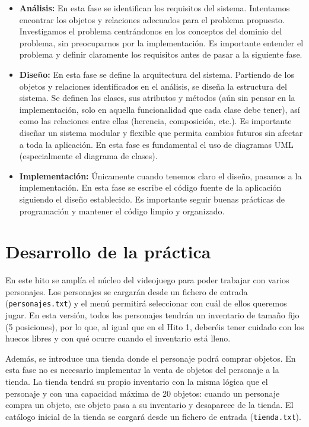 \documentclass[11pt,a4paper]{article}
\begin{document}
\begin{itemize}
    \item \textbf{Análisis:} En esta fase se identifican los requisitos del sistema. Intentamos encontrar los objetos y relaciones adecuados para el problema propuesto. Investigamos el problema centrándonos en los conceptos del dominio del problema, sin preocuparnos por la implementación. Es importante entender el problema y definir claramente los requisitos antes de pasar a la siguiente fase.
    \item \textbf{Diseño:} En esta fase se define la arquitectura del sistema. Partiendo de los objetos y relaciones identificados en el análisis, se diseña la estructura del sistema. Se definen las clases, sus atributos y métodos (aún sin pensar en la implementación, solo en aquella funcionalidad que cada clase debe tener), así como las relaciones entre ellas (herencia, composición, etc.). Es importante diseñar un sistema modular y flexible que permita cambios futuros sin afectar a toda la aplicación. En esta fase es fundamental el uso de diagramas UML (especialmente el diagrama de clases).
    \item \textbf{Implementación:} Únicamente cuando tenemos claro el diseño, pasamos a la implementación. En esta fase se escribe el código fuente de la aplicación siguiendo el diseño establecido. Es importante seguir buenas prácticas de programación y mantener el código limpio y organizado.
\end{itemize}

\section{Desarrollo de la práctica}

En este hito se amplía el núcleo del videojuego para poder trabajar con varios personajes. Los personajes se cargarán desde un fichero de entrada (\texttt{personajes.txt}) y el menú permitirá seleccionar con cuál de ellos queremos jugar. En esta versión, todos los personajes tendrán un inventario de tamaño fijo (5 posiciones), por lo que, al igual que en el Hito 1, deberéis tener cuidado con los huecos libres y con qué ocurre cuando el inventario está lleno.

Además, se introduce una tienda donde el personaje podrá comprar objetos. En esta fase no es necesario implementar la venta de objetos del personaje a la tienda. La tienda tendrá su propio inventario con la misma lógica que el personaje y con una capacidad máxima de 20 objetos: cuando un personaje compra un objeto, ese objeto pasa a su inventario y desaparece de la tienda.
El catálogo inicial de la tienda se cargará desde un fichero de entrada (\texttt{tienda.txt}).
\end{document}
